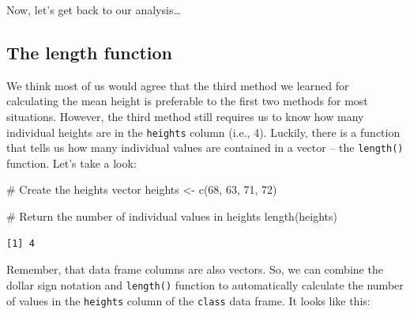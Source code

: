 \documentclass[
  letterpaper,
  DIV=11,
  numbers=noendperiod]{scrreprt}
\newenvironment{Shaded}{\begin{snugshade}}{\end{snugshade}}
\newcommand{\CommentTok}[1]{\textcolor[rgb]{0.37,0.37,0.37}{#1}}
\newcommand{\DecValTok}[1]{\textcolor[rgb]{0.68,0.00,0.00}{#1}}
\newcommand{\FunctionTok}[1]{\textcolor[rgb]{0.28,0.35,0.67}{#1}}
\newcommand{\NormalTok}[1]{\textcolor[rgb]{0.00,0.23,0.31}{#1}}
\newcommand{\OtherTok}[1]{\textcolor[rgb]{0.00,0.23,0.31}{#1}}
\newcommand{\SpecialCharTok}[1]{\textcolor[rgb]{0.37,0.37,0.37}{#1}}
\begin{document}
Now, let's get back to our analysis\ldots{}

\subsection{The length function}\label{the-length-function}

We think most of us would agree that the third method we learned for
calculating the mean height is preferable to the first two methods for
most situations. However, the third method still requires us to know how
many individual heights are in the \texttt{heights} column (i.e., 4).
Luckily, there is a function that tells us how many individual values
are contained in a vector -- the \texttt{length()} function. Let's take
a look:

\begin{Shaded}
\begin{Highlighting}[]
\CommentTok{\# Create the heights vector}
\NormalTok{heights }\OtherTok{\textless{}{-}} \FunctionTok{c}\NormalTok{(}\DecValTok{68}\NormalTok{, }\DecValTok{63}\NormalTok{, }\DecValTok{71}\NormalTok{, }\DecValTok{72}\NormalTok{)}

\CommentTok{\# Return the number of individual values in heights}
\FunctionTok{length}\NormalTok{(heights)}
\end{Highlighting}
\end{Shaded}

\begin{verbatim}
[1] 4
\end{verbatim}

Remember, that data frame columns are also vectors. So, we can combine
the dollar sign notation and \texttt{length()} function to automatically
calculate the number of values in the \texttt{heights} column of the
\texttt{class} data frame. It looks like this:

\begin{Shaded}
\end{Shaded}
\end{document}
